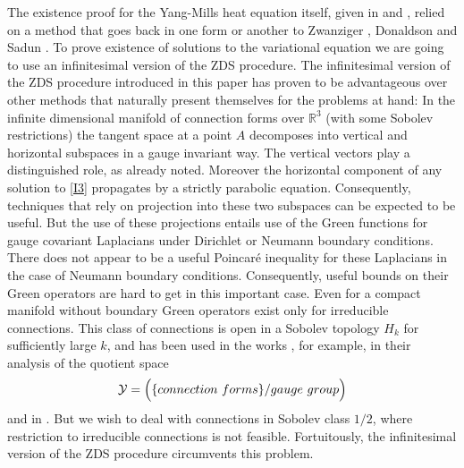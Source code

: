 \documentclass[12pt]{article}
\def \R{\mathbb R}
\def \Y{{\cal Y}}
\def \beq{\begin{equation}}
\def \eeq{\end{equation}}
\def \eref{\eqref}
\numberwithin{equation}{section}
\begin{document}
            The existence proof for the Yang-Mills heat equation itself, 
given in \cite{CG1} and \cite{G70}, relied on a method 
 that goes back in one form or another to Zwanziger \cite{Z}, Donaldson \cite{Do1}
 and Sadun \cite{Sa}.  To prove existence of solutions to the variational equation we are going
 to use an infinitesimal version of the ZDS procedure.  
 The infinitesimal version of the ZDS procedure introduced in this paper
  has proven to be advantageous 
  over other methods that    naturally present themselves
  for the problems at hand:
 In the infinite dimensional manifold  of connection forms  over $\R^3$ 
 (with some Sobolev restrictions)  
 the tangent space at a point $A$ decomposes
  into vertical and horizontal subspaces in a gauge invariant way. The vertical vectors
  play a distinguished role, as already noted.  Moreover the horizontal component of any
   solution to \eref{I3} propagates by a strictly parabolic equation. 
   Consequently, techniques that rely on projection into these two subspaces can be
    expected to be useful.  
             But the use of these projections entails use of the Green functions for  gauge covariant
    Laplacians under Dirichlet or Neumann boundary conditions. There does not appear
     to be a useful Poincar\'e inequality for  these Laplacians in the case of
      Neumann boundary conditions. Consequently, useful bounds on their Green operators
      are hard to get  
      in this important case.      
               Even  for a compact manifold
  without boundary Green operators exist only for irreducible connections. This  class
  of connections  is open in a Sobolev topology $H_k$ for sufficiently large $k$,
  and  has been used in the works \cite{AM,MV81}, for example, in their analysis of the quotient space
 \beq
 \Y = \Big(\{connection\ forms\}/ gauge\ group\Big)        \label{I6}
 \eeq
 and in \cite{NR}.
  But we wish to deal with connections in Sobolev class
  $1/2$, where restriction to irreducible connections is not feasible. Fortuitously, 
  the infinitesimal   version of the ZDS procedure circumvents 
  this problem. 
  
 
  
\end{document}
